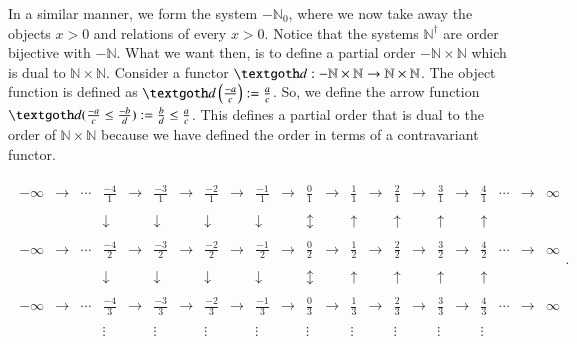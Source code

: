 \documentclass [12pt]{book}
\begin{document}
In a similar manner, we form the system $-\mathbb{N}_{0}$, where we now take away the objects $x>0$ and relations of every $x>0$. Notice that the systems $\mathbb N^\dagger$ are order bijective with $-\mathbb N$. What we want then, is to define a partial order $-\mathbb N\times\mathbb N$ which is dual to $\mathbb N\times\mathbb N$. Consider a functor $\textgoth d:-\mathbb N\times\mathbb N\rightarrow\mathbb N\times\mathbb N$. The object function is defined as $\textgoth d\left(\frac{-a}{c}\right):=\frac ac$. So, we define the arrow function $\textgoth d(\frac{-a}{c}\leq\frac{-b}{d}):=\frac bd\leq\frac ac$. This defines a partial order that is dual to the order of $\mathbb N\times\mathbb N$ because we have defined the order in terms of a contravariant functor.

\begin{eqnarray}\begin{array}{rrrrrrrrrrrrrrrrrrrrrrrrrrrrrrrrrrrrrrrrrrrrrrrrrrrrrrrrrrrrrrrrrrrrrrrrrrrrrrrr}-\infty&\rightarrow &\cdots & \frac{-4}{1}&\rightarrow & \frac{-3}{1}&\rightarrow  & \frac{-2}{1}&\rightarrow  & \frac{-1}{1}&\rightarrow  & \frac{0}{1}&\rightarrow   & \frac{1}{1} &\rightarrow & \frac{2}{1}&\rightarrow  & \frac{3}{1}&\rightarrow  & \frac{4}{1} &\cdots&\rightarrow&\infty\\\\ &&&\downarrow&& \downarrow&&\downarrow&& \downarrow&&\updownarrow&&\uparrow &&\uparrow&&\uparrow&&
\uparrow&&& \\\\-\infty&\rightarrow&\cdots & \frac{-4}{2}&\rightarrow & \frac{-3}{2}&\rightarrow  & \frac{-2}{2}&\rightarrow  & \frac{-1}{2}&\rightarrow  & \frac{0}{2}&\rightarrow   & \frac{1}{2} &\rightarrow & \frac{2}{2}&\rightarrow  & \frac{3}{2}&\rightarrow  & \frac{4}{2}&\cdots &\rightarrow&\infty\\
\\ &&&\downarrow&& \downarrow&&\downarrow&& \downarrow&&\updownarrow&&\uparrow &&\uparrow&&\uparrow&&\uparrow&&& \\\\-\infty&\rightarrow&\cdots & \frac{-4}{3}&\rightarrow & \frac{-3}{3}&\rightarrow  & \frac{-2}{3}&\rightarrow  & \frac{-1}{3}&\rightarrow  & \frac{0}{3}&\rightarrow   & \frac{1}{3} &\rightarrow & \frac{2}{3}&\rightarrow  & \frac{3}{3}&\rightarrow  & \frac{4}{3} &\cdots&\rightarrow &\infty\\\\
&&&\vdots & &\vdots & & \vdots & & \vdots  && \vdots  && \vdots && \vdots && \vdots && \vdots & & &\end{array}.\end{eqnarray}
\end{document}
